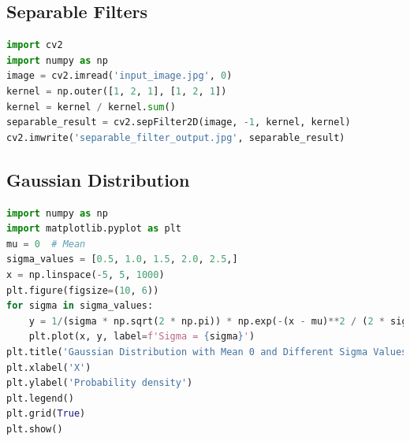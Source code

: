 \documentclass{report}
\begin{document}
\subsection{Separable Filters}
\begin{lstlisting}[language=Python, caption=Separable Filter Implementation]
import cv2
import numpy as np
image = cv2.imread('input_image.jpg', 0)
kernel = np.outer([1, 2, 1], [1, 2, 1])
kernel = kernel / kernel.sum()
separable_result = cv2.sepFilter2D(image, -1, kernel, kernel)
cv2.imwrite('separable_filter_output.jpg', separable_result)
\end{lstlisting}

\subsection{Gaussian Distribution}
\begin{lstlisting}[language=Python, caption=Gaussion Distribution]
import numpy as np
import matplotlib.pyplot as plt
mu = 0  # Mean
sigma_values = [0.5, 1.0, 1.5, 2.0, 2.5,]
x = np.linspace(-5, 5, 1000)
plt.figure(figsize=(10, 6))
for sigma in sigma_values:
    y = 1/(sigma * np.sqrt(2 * np.pi)) * np.exp(-(x - mu)**2 / (2 * sigma**2))
    plt.plot(x, y, label=f'Sigma = {sigma}')
plt.title('Gaussian Distribution with Mean 0 and Different Sigma Values')
plt.xlabel('X')
plt.ylabel('Probability density')
plt.legend()
plt.grid(True)
plt.show()
\end{lstlisting}
\end{document}
